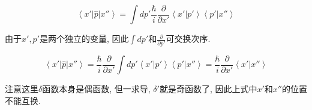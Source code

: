 \begin{enumerate}
\begin{equation*}
\left\langle x' \right| \hat p \left| x'' \right\rangle = \int dp'
\frac{\hbar}{i}\frac{\partial }{\partial x'} \left\langle x' | p'
\right\rangle \left\langle p' | x'' \right\rangle
\end{equation*}

由于$x', p'$是两个独立的变量, 因此$\int
dp'$和$\frac{\partial}{\partial p'}$可交换次序.

\begin{equation*}
\left\langle x' \right| \hat p \left| x'' \right\rangle =
\frac{\hbar}{i}\frac{\partial }{\partial x'} \int dp' \left\langle
x' | p' \right\rangle \left\langle p' | x'' \right\rangle =
\frac{\hbar}{i}\frac{\partial }{\partial x'} \left\langle x' | x''
\right\rangle
\end{equation*}

注意这里$\delta$函数本身是偶函数, 但一求导, $\delta'$就是奇函数了,
因此上式中$x'$和$x''$的位置不能互换.



\end{enumerate}
